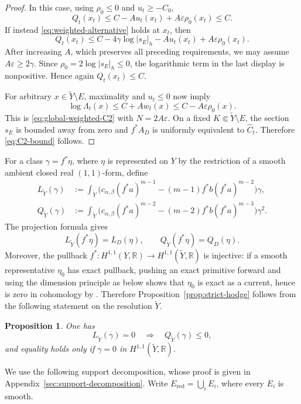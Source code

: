 \documentclass[reqno]{amsart}
\newcommand{\R}{\mathbb{R}}
\newcommand{\cab}{c_{\alpha,\beta}}
\theoremstyle{plain}
\newtheorem{proposition}[thm]{Proposition}
\theoremstyle{remark}
\begin{document}
\begin{proof}
In this case, using $\rho_0\leq0$ and $u_t\geq-C_0$,
\[
 Q_t(x_t)\leq C-Au_t(x_t)+A\varepsilon\rho_0(x_t)\leq C.
\]
If instead \eqref{eq:weighted-alternative} holds at $x_t$, then
\[
 Q_t(x_t)
 \leq C-4\gamma\log|s_E|_{h}
      -Au_t(x_t)+A\varepsilon\rho_0(x_t).
\]
After increasing $A$, which preserves all preceding requirements, we
may assume $A\varepsilon\geq2\gamma$.  Since
$\rho_0=2\log|s_E|_{h}\leq0$, the logarithmic
term in the last display is nonpositive.  Hence again
$Q_t(x_t)\leq C$.

For arbitrary $x\in\widetilde Y\setminus E$, maximality and $u_t\leq0$ now imply
\[
 \log\Lambda_t(x)
 \leq C+Aw_t(x)
 \leq C-A\varepsilon\rho_0(x).
\]
This is \eqref{eq:global-weighted-C2} with
$N=2A\varepsilon$.  On a fixed $K\Subset \widetilde Y\setminus E$, the section
$s_E$ is bounded away from zero and
$f^*A_D$ is uniformly equivalent to $\widehat C_t$.  Therefore
\eqref{eq:C2-bound} follows.
\end{proof}




For a class $\gamma=f^*\eta$, where $\eta$ is represented on $Y$
by the restriction of a smooth ambient closed real $(1,1)$-form,
define
\begin{align}
 L_{\widetilde Y}(\gamma)
 &:=\int_{\widetilde Y}
 \bigl(\cab(f^*a)^{m-1}
 -(m-1)f^*b(f^*a)^{m-2}\bigr)\gamma,
\label{eq:L-resolution}\\
Q_{\widetilde Y}(\gamma)
 &:=\int_{\widetilde Y}
 \bigl(\cab(f^*a)^{m-2}
 -(m-2)f^*b(f^*a)^{m-3}\bigr)\gamma^2.
\label{eq:Q-resolution}
\end{align}
The projection formula gives
\[
 L_{\widetilde Y}(f^*\eta)=L_D(\eta),
 \qquad
 Q_{\widetilde Y}(f^*\eta)=Q_D(\eta).
\]
Moreover, the pullback $f^*:H^{1,1}(Y,\R)\to
H^{1,1}(\widetilde Y,\R)$ is injective: if a smooth representative
$\eta_0$ has exact pullback, pushing an exact primitive forward and
using the dimension principle as below shows that $\eta_0$ is exact as
a current, hence is zero in cohomology by \cite{BH69}. Therefore
Proposition~\ref{prop:strict-hodge} follows from the following
statement on the resolution $\widetilde Y$.
\begin{proposition}
\label{prop:strict-hodge-blowup}
One has
\[
 L_{\widetilde Y}(\gamma)=0\quad\Longrightarrow\quad Q_{\widetilde Y}(\gamma)\leq0,
\]
and equality holds only if $\gamma=0$ in
$H^{1,1}(\widetilde Y,\R)$.
\end{proposition}



We use the following support decomposition, whose proof is given in
Appendix~\ref{sec:support-decomposition}. Write
$E_{\mathrm{red}}=\bigcup_i E_i$, where every $E_i$ is smooth.
\end{document}
